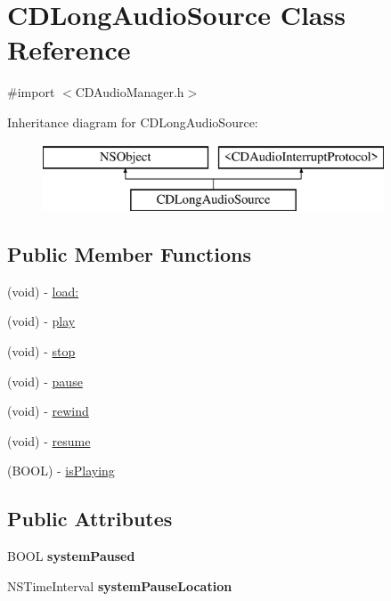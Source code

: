 \hypertarget{interface_c_d_long_audio_source}{\section{C\-D\-Long\-Audio\-Source Class Reference}
\label{interface_c_d_long_audio_source}
}


{\ttfamily \#import $<$C\-D\-Audio\-Manager.\-h$>$}

Inheritance diagram for C\-D\-Long\-Audio\-Source\-:\begin{figure}[H]
\begin{center}
\leavevmode
\includegraphics[height=2.000000cm]{interface_c_d_long_audio_source}
\end{center}
\end{figure}
\subsection*{Public Member Functions}
\begin{DoxyCompactItemize}
\item 
(void) -\/ \hyperlink{interface_c_d_long_audio_source_a50cff2f77f96cf9a2655d5e18af9f225}{load\-:}
\item 
(void) -\/ \hyperlink{interface_c_d_long_audio_source_a2e2e9ba6cb50860a4ef8e310dc8eab65}{play}
\item 
(void) -\/ \hyperlink{interface_c_d_long_audio_source_ae77879d7c0e770cf58f8b8fb27cc29d4}{stop}
\item 
(void) -\/ \hyperlink{interface_c_d_long_audio_source_a66db0e34e875823c4c0ea87b2036369c}{pause}
\item 
(void) -\/ \hyperlink{interface_c_d_long_audio_source_a2641a580b551bbd9e3ae8473af697284}{rewind}
\item 
(void) -\/ \hyperlink{interface_c_d_long_audio_source_a0cbc59ea523580c5e5338063b7a0df5f}{resume}
\item 
(B\-O\-O\-L) -\/ \hyperlink{interface_c_d_long_audio_source_a555f3c24d76f6e4d23bd809c2d064994}{is\-Playing}
\end{DoxyCompactItemize}
\subsection*{Public Attributes}
\begin{DoxyCompactItemize}
\item 
\hypertarget{interface_c_d_long_audio_source_a0b3ae1b0fd9e1c07e45cf0d42dc9da99}{B\-O\-O\-L {\bfseries system\-Paused}}\label{interface_c_d_long_audio_source_a0b3ae1b0fd9e1c07e45cf0d42dc9da99}

\item 
\hypertarget{interface_c_d_long_audio_source_a8955dbe7f4db7914793b01adab5cb23e}{N\-S\-Time\-Interval {\bfseries system\-Pause\-Location}}\label{interface_c_d_long_audio_source_a8955dbe7f4db7914793b01adab5cb23e}

\end{DoxyCompactItemize}
